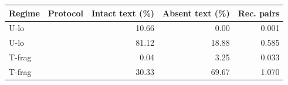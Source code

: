 \begin{tabular}{llrrr}
\toprule
Regime & Protocol & Intact text (\%) & Absent text (\%) & Rec. pairs \\
\midrule
U-lo & \tokenlevel{} & 10.66 & 0.00 & 0.001 \\
U-lo & \modlevel{} & 81.12 & 18.88 & 0.585 \\
T-frag & \tokenlevel{} & 0.04 & 3.25 & 0.033 \\
T-frag & \modlevel{} & 30.33 & 69.67 & 1.070 \\
\bottomrule
\end{tabular}
